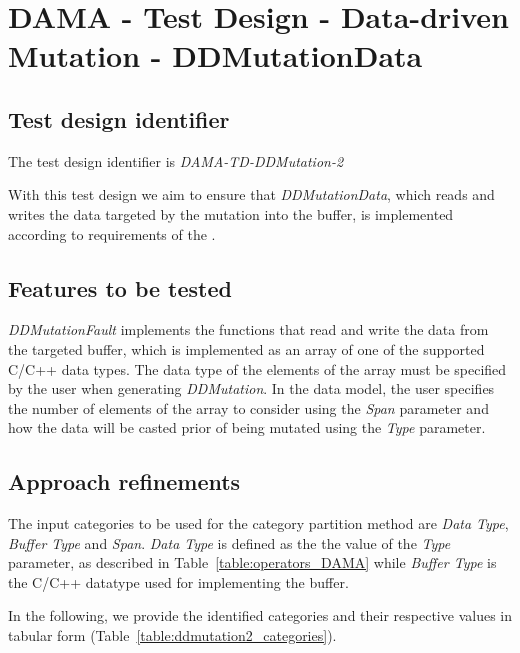 \section{DAMA - Test Design - Data-driven Mutation - DDMutationData}

\subsection{Test design identifier}
%
The test design identifier is \emph{DAMA-TD-DDMutation-2}

With this test design we aim to ensure that \emph{DDMutationData}, which reads and writes the data targeted by the mutation into the buffer, is implemented according to requirements of the \FAQAS.
%
\subsection{Features to be tested}

\emph{DDMutationFault} implements the functions that read and write the data from the targeted buffer, which is implemented as an array of one of the supported C/C++ data types.
The data type of the elements of the array must be specified by the user when generating \emph{DDMutation}.
In the data model, the user specifies the number of elements of the array to consider using the \emph{Span} parameter and how the data will be casted prior of being mutated using the \emph{Type} parameter.


\subsection{Approach refinements}
%
The input categories to be used for the category partition method are \emph{Data Type}, \emph{Buffer Type} and \emph{Span}.
\emph{Data Type} is defined as the the value of the \emph{Type} parameter, as described in Table~\ref{table:operators_DAMA} while \emph{Buffer Type} is the C/C++ datatype used for implementing the buffer.

In the following, we provide the identified categories and their respective values in tabular form (Table~\ref{table:ddmutation2_categories}).

